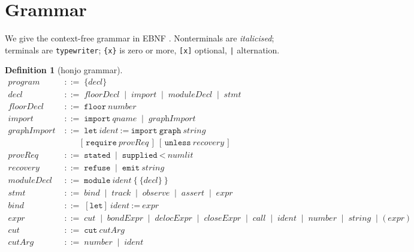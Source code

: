\documentclass[11pt,twocolumn,a4paper]{article}
\theoremstyle{thmstyle}
\theoremstyle{definition}
\newtheorem{definition}[theorem]{Definition}
\theoremstyle{remark}
\newcommand{\bnf}{\;::=\;}
\newcommand{\alt}{\;\mid\;}
\newcommand{\hj}[1]{\texttt{#1}}
\begin{document}
\section{Grammar}
\label{sec:grammar}

We give the context-free grammar in EBNF \citep{ebnf2017}. Nonterminals
are \textit{italicised}; terminals are \hj{typewriter}; \hj{\{x\}} is zero
or more, \hj{[x]} optional, \hj{|} alternation.

\begin{definition}[honjo grammar]
\label{def:grammar}
\begin{align*}
\textit{program} &\bnf \{\textit{decl}\} \\[2pt]
\textit{decl} &\bnf \textit{floorDecl} \alt \textit{import}
   \alt \textit{moduleDecl} \alt \textit{stmt} \\[2pt]
\textit{floorDecl} &\bnf \hj{floor}\ \textit{number} \\
\textit{import} &\bnf \hj{import}\ \textit{qname}
   \alt \textit{graphImport} \\
\textit{graphImport} &\bnf \hj{let}\ \textit{ident}\ \hj{:=}\
   \hj{import}\ \hj{graph}\ \textit{string} \\
   &\qquad [\,\hj{require}\ \textit{provReq}\,]\
   [\,\hj{unless}\ \textit{recovery}\,] \\[2pt]
\textit{provReq} &\bnf \hj{stated} \alt
   \hj{supplied}\ \hj{<}\ \textit{numlit} \\
\textit{recovery} &\bnf \hj{refuse} \alt \hj{emit}\ \textit{string} \\[2pt]
\textit{moduleDecl} &\bnf \hj{module}\ \textit{ident}\ \hj{\{}\ \{\textit{decl}\}\ \hj{\}} \\[2pt]
\textit{stmt} &\bnf \textit{bind} \alt \textit{track} \alt \textit{observe}
   \alt \textit{assert} \alt \textit{expr} \\[2pt]
\textit{bind} &\bnf [\hj{let}]\ \textit{ident}\ \hj{:=}\ \textit{expr} \\[2pt]
\textit{expr} &\bnf \textit{cut} \alt \textit{bondExpr}
   \alt \textit{delocExpr} \alt \textit{closeExpr} \alt \textit{call}
   \alt \textit{ident} \alt \textit{number} \alt \textit{string}
   \alt \hj{(}\ \textit{expr}\ \hj{)} \\[2pt]
\textit{cut} &\bnf \hj{cut}\ \textit{cutArg} \\
\textit{cutArg} &\bnf \textit{number} \alt \textit{ident} \\[2pt]

\end{align*}
\end{definition}
\end{document}
